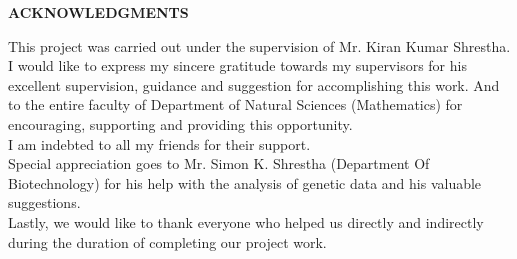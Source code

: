



\begin{center}
	{\Large{\bf{ACKNOWLEDGMENTS}}}\\
\end{center}


\noindent
This project was carried out under the supervision of Mr. Kiran Kumar Shrestha. I would like to express my sincere gratitude towards my supervisors for his excellent supervision, guidance and suggestion for accomplishing this work. And to the entire faculty of Department of Natural Sciences (Mathematics) for encouraging, supporting and providing this opportunity.\\

\noindent
I am indebted to all my friends for their support. \\

\noindent
Special appreciation goes to Mr. Simon K. Shrestha (Department Of Biotechnology) for his help with the analysis of genetic data and his valuable suggestions. \\


\noindent
Lastly, we would like to thank everyone who helped us directly and indirectly during the duration of completing our project work.




